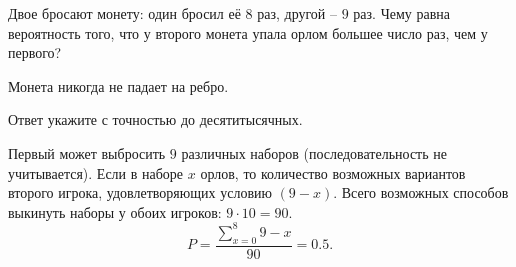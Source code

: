 
Двое бросают монету: один бросил её $8$ раз, другой – $9$ раз. Чему равна вероятность того, что у второго монета упала орлом большее число раз, чем у первого?

Монета никогда не падает на ребро.

Ответ укажите с точностью до десятитысячных.

\solutionSection

Первый может выбросить $9$ различных наборов (последовательность не учитывается). Если в наборе $x$ орлов, то количество возможных вариантов второго игрока, удовлетворяющих условию $(9 - x)$. Всего возможных способов выкинуть наборы у обоих игроков: $9 \cdot 10 = 90$. $$P = \frac{\sum\limits_{x=0}^8{9-x}}{90}=0.5.$$


